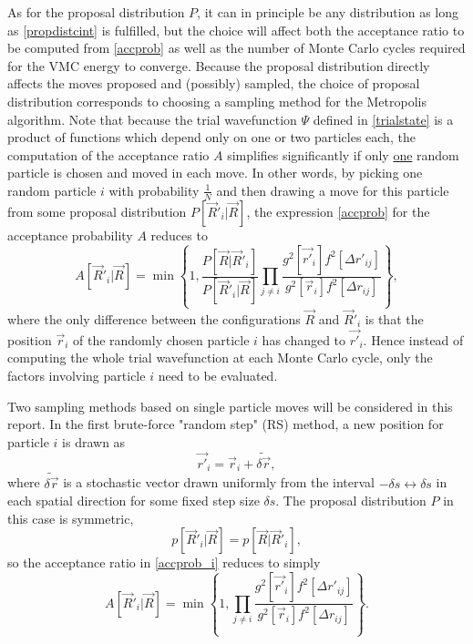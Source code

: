 \documentclass[a4paper,8pt]{article}
\begin{document}
\begin{multicols}{2}
As for the proposal distribution $P$, it can in principle be any distribution as long as \eqref{propdistcint} is fulfilled, but the choice will affect both the acceptance ratio to be computed from \eqref{accprob} as well as the number of Monte Carlo cycles required for the VMC energy to converge. Because the proposal distribution directly affects the moves proposed and (possibly) sampled, the choice of proposal distribution corresponds to choosing a sampling method for the Metropolis algorithm. Note that because the trial wavefunction $\Psi$ defined in \eqref{trialstate} is a product of functions which depend only on one or two particles each, the computation of the acceptance ratio $A$ simplifies significantly if only \underline{one} random particle is chosen and moved in each move. In other words, by picking one random particle $i$ with probability $\frac{1}{N}$ and then drawing a move for this particle from some proposal distribution $P[\vec{R}'_i|\vec{R}]$, the expression \eqref{accprob} for the acceptance probability $A$ reduces to
\begin{equation}\label{accprob_i}
A[\vec{R}'_i|\vec{R}] = \min\left\{1,\frac{P[\vec{R}|\vec{R}'_i]}{P[\vec{R}'_i|\vec{R}]}\prod\limits_{j \neq i} \frac{g^2[\vec{r'}_i]f^2[\Delta r'_{ij}]}{g^2[\vec{r}_i]f^2[\Delta r_{ij}]}\right\},
\end{equation}
where the only difference between the configurations $\vec{R}$ and $\vec{R}'_i$ is that the position $\vec{r}_i$ of the randomly chosen particle $i$ has changed to $\vec{r'}_i$.  Hence instead of computing the whole trial wavefunction at each Monte Carlo cycle, only the factors involving particle $i$ need to be evaluated.

Two sampling methods based on single particle moves will be considered in this report. In the first brute-force "random step" (RS) method, a new position for particle $i$ is drawn as
\begin{equation}\label{propRS}
\vec{r'}_i = \vec{r}_i+\widetilde{\delta\vec{r}},
\end{equation}
where $\widetilde{\delta\vec{r}}$ is a stochastic vector drawn uniformly from the interval $-\delta s \leftrightarrow \delta s$ in each spatial direction for some fixed step size $\delta s$. The proposal distribution $P$ in this case is symmetric,
\begin{equation}
p[\vec{R}'_i|\vec{R}] = p[\vec{R}|\vec{R}'_i], \nonumber
\end{equation}
so the acceptance ratio in \eqref{accprob_i} reduces to simply
\begin{equation}\label{accprobRS}
A[\vec{R}'_i|\vec{R}] = \min\left\{1,\prod\limits_{j \neq i} \frac{g^2[\vec{r'}_i]f^2[\Delta r'_{ij}]}{g^2[\vec{r}_i]f^2[\Delta r_{ij}]}\right\}.
\end{equation}



\end{multicols}
\end{document}
